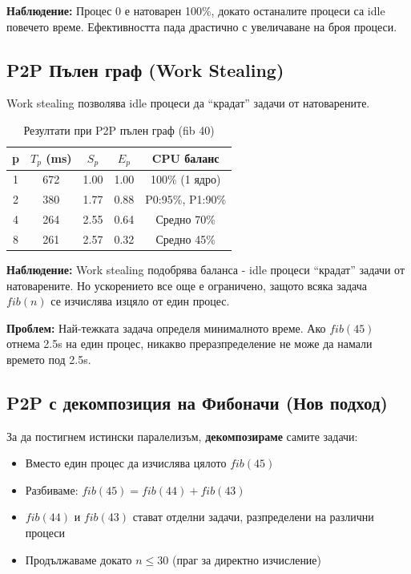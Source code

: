 \documentclass[12pt,a4paper]{article}
\begin{document}
\textbf{Наблюдение:} Процес 0 е натоварен 100\%, докато останалите процеси са idle повечето време. Ефективността пада драстично с увеличаване на броя процеси.

\subsection{P2P Пълен граф (Work Stealing)}

Work stealing позволява idle процеси да ``крадат'' задачи от натоварените.

\begin{table}[H]
\centering
\begin{tabular}{ccccc}
\toprule
\textbf{p} & \textbf{$T_p$ (ms)} & \textbf{$S_p$} & \textbf{$E_p$} & \textbf{CPU баланс} \\
\midrule
1 & 672 & 1.00 & 1.00 & 100\% (1 ядро) \\
2 & 380 & 1.77 & 0.88 & P0:95\%, P1:90\% \\
4 & 264 & 2.55 & 0.64 & Средно 70\% \\
8 & 261 & 2.57 & 0.32 & Средно 45\% \\
\bottomrule
\end{tabular}
\caption{Резултати при P2P пълен граф (fib 40)}
\end{table}

\textbf{Наблюдение:} Work stealing подобрява баланса - idle процеси ``крадат'' задачи от натоварените. Но ускорението все още е ограничено, защото всяка задача $fib(n)$ се изчислява изцяло от един процес.

\textbf{Проблем:} Най-тежката задача определя минималното време. Ако $fib(45)$ отнема 2.5s на един процес, никакво преразпределение не може да намали времето под 2.5s.

\subsection{P2P с декомпозиция на Фибоначи (Нов подход)}

За да постигнем истински паралелизъм, \textbf{декомпозираме} самите задачи:

\begin{itemize}
    \item Вместо един процес да изчислява цялото $fib(45)$
    \item Разбиваме: $fib(45) = fib(44) + fib(43)$
    \item $fib(44)$ и $fib(43)$ стават отделни задачи, разпределени на различни процеси
    \item Продължаваме докато $n \leq 30$ (праг за директно изчисление)
\end{itemize}
\end{document}
